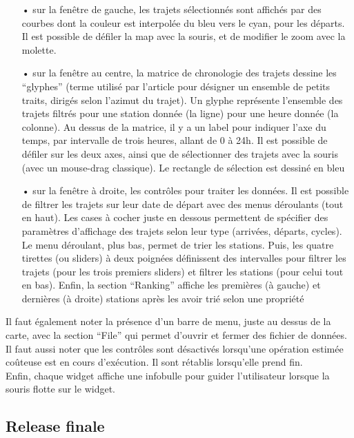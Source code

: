 \documentclass[12pt]{article}
\begin{document}
		\begin{itemize}
		\item[•] sur la fenêtre de gauche, les trajets sélectionnés sont affichés par des courbes dont la couleur est interpolée du bleu vers le cyan, pour les départs. Il est possible de défiler la map avec la souris, et de modifier le zoom avec la molette.
		\item[•] sur la fenêtre au centre, la matrice de chronologie des trajets dessine les “glyphes” (terme utilisé par l’article pour désigner un ensemble de petits traits, dirigés selon l’azimut du trajet). Un glyphe représente l’ensemble des trajets filtrés pour une station donnée (la ligne) pour une heure donnée (la colonne). Au dessus de la matrice, il y a un label pour indiquer l’axe du temps, par intervalle de trois heures, allant de 0 à 24h. Il est possible de défiler sur les deux axes, ainsi que de sélectionner des trajets avec la souris (avec un mouse-drag classique). Le rectangle de sélection est dessiné en bleu
		\item[•] sur la fenêtre à droite, les contrôles pour traiter les données. Il est possible de filtrer les trajets sur leur date de départ avec des menus déroulants (tout en haut). Les cases à cocher juste en dessous permettent de spécifier des paramètres d’affichage des trajets selon leur type (arrivées, départs, cycles). Le menu déroulant, plus bas, permet de trier les stations. Puis, les quatre tirettes (ou sliders) à deux poignées définissent des intervalles pour filtrer les trajets (pour les trois premiers sliders) et filtrer les stations (pour celui tout en bas). Enfin, la section “Ranking” affiche les premières (à gauche) et dernières (à droite) stations après les avoir trié selon une propriété
		\end{itemize}
		
		Il faut également noter la présence d’un barre de menu, juste au dessus de la carte, avec la section “File” qui permet d’ouvrir et fermer des fichier de données.\\

		Il faut aussi noter que les contrôles sont désactivés lorsqu’une opération estimée coûteuse est en cours d'exécution. Il sont rétablis lorsqu’elle prend fin.\\

		Enfin, chaque widget affiche une infobulle pour guider l’utilisateur lorsque la souris flotte sur le widget.

		\subsection{Release finale}
		
\end{document}

